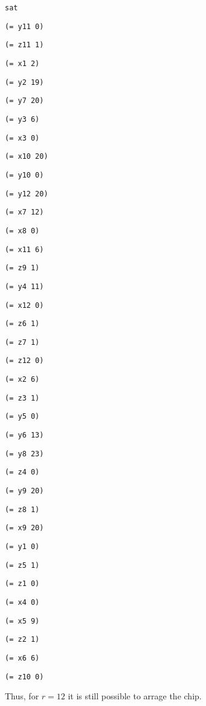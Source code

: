 \documentclass[12pt]{article}
\begin{document}
{ \footnotesize
{\tt sat }

{\tt  }

{\tt (= y11 0) }

{\tt (= z11 1) }

{\tt (= x1 2) }

{\tt (= y2 19) }

{\tt (= y7 20) }

{\tt (= y3 6) }

{\tt (= x3 0) }

{\tt (= x10 20) }

{\tt (= y10 0) }

{\tt (= y12 20) }

{\tt (= x7 12) }

{\tt (= x8 0) }

{\tt (= x11 6) }

{\tt (= z9 1) }

{\tt (= y4 11) }

{\tt (= x12 0) }

{\tt (= z6 1) }

{\tt (= z7 1) }

{\tt (= z12 0) }

{\tt (= x2 6) }

{\tt (= z3 1) }

{\tt (= y5 0) }

{\tt (= y6 13) }

{\tt (= y8 23) }

{\tt (= z4 0) }

{\tt (= y9 20) }

{\tt (= z8 1) }

{\tt (= x9 20) }

{\tt (= y1 0) }

{\tt (= z5 1) }

{\tt (= z1 0) }

{\tt (= x4 0) }

{\tt (= x5 9) }

{\tt (= z2 1) }

{\tt (= x6 6) }

{\tt (= z10 0) }

{\tt  }
}

Thus, for $r=12$ it is still possible to arrage the chip.
\end{document}
